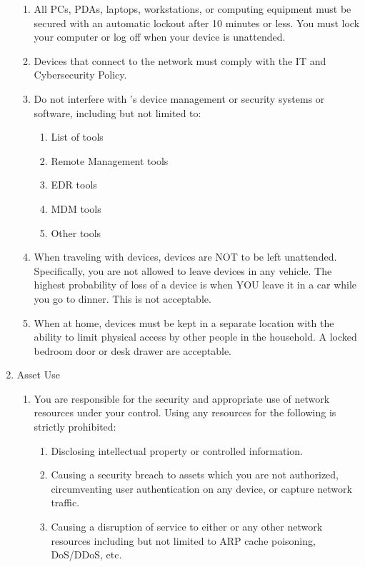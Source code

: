 \documentclass[../main.tex]{subfiles}
\begin{document}
\begin{enumerate}
\begin{enumerate}
        \item All PCs, PDAs, laptops, workstations, or computing equipment must be secured with an automatic lockout after 10 minutes or less. You must lock your computer or log off when your
        device is unattended.
        \item Devices that connect to the \CompanyName{} network must comply with the IT and Cybersecurity Policy.
        \item Do not interfere with \CompanyName's device management or security systems or software, including but not limited to:
        \begin{enumerate}
            \item List of \CompanyName{} tools
            \item Remote Management tools
            \item EDR tools
            \item MDM tools
            \item Other tools
        \end{enumerate}
        \item When traveling with \CompanyName{} devices, devices are NOT to be left unattended. Specifically, you are not allowed to leave \CompanyName{} devices in any vehicle.
        The highest probability of loss of a device is when YOU leave it in a car while you go to dinner. This is not acceptable.
        \item When at home, devices must be kept in a separate location with the ability to limit physical access by other people in the household.
        A locked bedroom door or desk drawer are acceptable.
    \end{enumerate}
    \item Asset Use
    \begin{enumerate}
        \item You are responsible for the security and appropriate use of \CompanyName{} network resources under your control. Using any \CompanyName{} resources for the following is strictly prohibited:
        \begin{enumerate}
            \item Disclosing \CompanyName{} intellectual property or controlled information.
            \item Causing a security breach to \CompanyName{} assets which you are not authorized, circumventing user authentication on any device, or capture network traffic.
            \item Causing a disruption of service to either \CompanyName{} or any other network resources including but not limited to ARP cache poisoning, DoS/DDoS, etc.

\end{enumerate}
\end{enumerate}
\end{enumerate}
\end{document}
